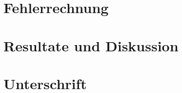 \documentclass{fhnwreport/fhnwreport}
\begin{document}
\clearpage
\section{Fehlerrechnung}
\label{sec:fehlerrechnung}



\clearpage
\section{Resultate und Diskussion}
\label{sec:results}



\clearpage
\section*{Unterschrift}
\label{sec:signature}



\clearpage
\begin{appendices}
    \label{sec:appendix}
    
\end{appendices}

\clearpage
{}
{}
{}
\end{document}
